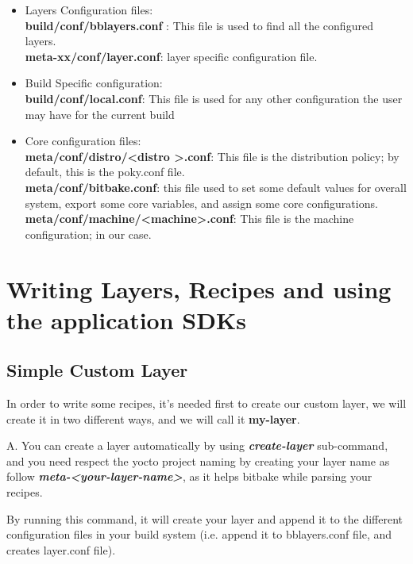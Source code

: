 \documentclass{article}
\begin{document}
\begin{itemize}
    \item Layers Configuration files:\\ \textbf{build/conf/bblayers.conf} : This file is used to find all the configured layers.\\
    \textbf{meta-xx/conf/layer.conf}: layer specific configuration file.
    \item Build Specific configuration:\\ \textbf{build/conf/local.conf}: This file is used for any other configuration the user may have for the current build
    \item Core configuration files: \\ \textbf{meta/conf/distro/\textless distro \textgreater .conf}: This file is the distribution policy; by default, this is the poky.conf file.\\
    \textbf{meta/conf/bitbake.conf}: this file used to set some default values for overall system, export some core variables, and assign some core configurations.\\
    \textbf{meta/conf/machine/\textless machine\textgreater .conf}: This file is the machine configuration; in our case.\\
\end{itemize}

\section{Writing Layers, Recipes and using the application SDKs}
\subsection{Simple Custom Layer}
\label{simple-custom-layers}
In order to write some recipes, it's needed first to create our custom layer, we will create it in two different ways, and we will call it \textbf{my-layer}.

A. You can create a layer automatically by using \textbf{\textit{create-layer}} sub-command, and you need respect the yocto project naming by creating your layer name as follow \textbf{\textit{meta-\textless your-layer-name\textgreater}}, as it helps bitbake while parsing your recipes.
  

By running this command, it will create your layer and append it to the different configuration files in your build system (i.e. append it to bblayers.conf file, and creates layer.conf file).\\
\end{document}
